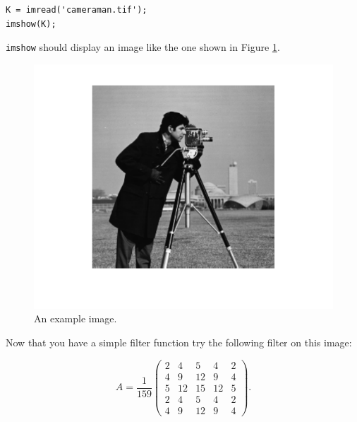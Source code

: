 \begin{verbatim}
K = imread('cameraman.tif');
imshow(K);
\end{verbatim}

{\tt imshow} should display an image like the one shown in Figure \ref{imfil:camclean}.

\begin{figure}
\includegraphics{cameramanClean.pdf}
\caption{An example image.}
\label{imfil:camclean}
\end{figure}

Now that you have a simple filter function try the following filter on this image:

\[
A = \frac{1}{159}\begin{pmatrix}
2&4&5&4&2\\
4&9&12&9&4\\
5&12&15&12&5\\
2&4&5&4&2\\
4&9&12&9&4
\end{pmatrix}.
\]

